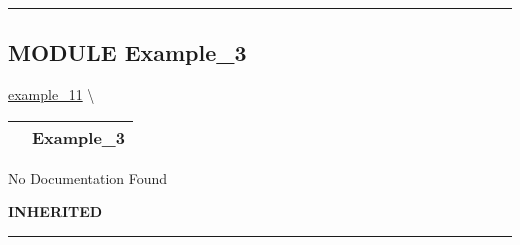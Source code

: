 \rule{\linewidth}{0.5pt}

\subsection*{\textsf{\colorbox{headtoc}{\color{white} MODULE}
Example\_3}}

\hypertarget{ecldoc:Inintest.Example_3}{}
\hspace{0pt} \hyperlink{ecldoc:example_11}{example_11} \textbackslash 

{\renewcommand{\arraystretch}{1.5}
\begin{tabularx}{\textwidth}{|>{\raggedright\arraybackslash}l|X|}
\hline
\hspace{0pt}\mytexttt{\color{red} } & \textbf{Example\_3} \\
\hline
\end{tabularx}
}

\par





No Documentation Found









\par
\begin{description}
\item [\colorbox{tagtype}{\color{white} \textbf{\textsf{INHERITED}}}] 
\end{description}



\rule{\linewidth}{0.5pt}


